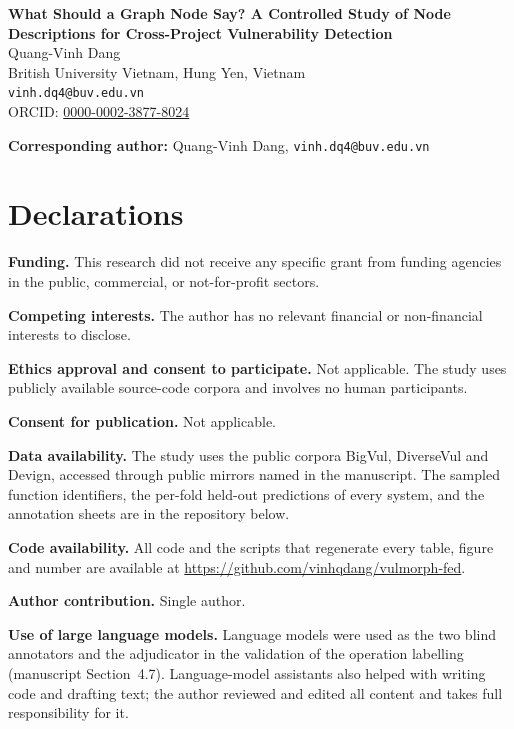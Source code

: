 \documentclass[11pt]{article}
\begin{document}
\begin{center}
{\LARGE\bfseries What Should a Graph Node Say? A Controlled Study of Node
Descriptions for Cross-Project Vulnerability Detection}\\[1.5em]
{\large Quang-Vinh Dang}\\[0.4em]
British University Vietnam, Hung Yen, Vietnam\\
\texttt{vinh.dq4@buv.edu.vn}\\
ORCID: \href{https://orcid.org/0000-0002-3877-8024}{0000-0002-3877-8024}
\end{center}

\textbf{Corresponding author:} Quang-Vinh Dang, \texttt{vinh.dq4@buv.edu.vn}

\section*{Declarations}
\textbf{Funding.} This research did not receive any specific grant from funding
agencies in the public, commercial, or not-for-profit sectors.

\textbf{Competing interests.} The author has no relevant financial or
non-financial interests to disclose.

\textbf{Ethics approval and consent to participate.} Not applicable. The study
uses publicly available source-code corpora and involves no human participants.

\textbf{Consent for publication.} Not applicable.

\textbf{Data availability.} The study uses the public corpora BigVul,
DiverseVul and Devign, accessed through public mirrors named in the manuscript.
The sampled function identifiers, the per-fold held-out predictions of every
system, and the annotation sheets are in the repository below.

\textbf{Code availability.} All code and the scripts that regenerate every
table, figure and number are available at
\url{https://github.com/vinhqdang/vulmorph-fed}.

\textbf{Author contribution.} Single author.

\textbf{Use of large language models.} Language models were used as the two blind
annotators and the adjudicator in the validation of the operation labelling
(manuscript Section~4.7). Language-model assistants also helped with writing
code and drafting text; the author reviewed and edited all content and takes full
responsibility for it.
\end{document}
